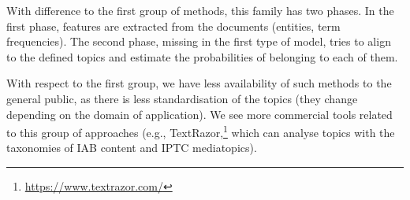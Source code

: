 With difference to the first group of methods, this family has two phases.
In the first phase, features are extracted from the documents (entities, term frequencies).
The second phase, missing in the first type of model, tries to align to the defined topics and estimate the probabilities of belonging to each of them.

With respect to the first group, we have less availability of such methods to the general public, as there is less standardisation of the topics (they change depending on the domain of application).
We see more commercial tools related to this group of approaches (e.g., TextRazor,\footnote{\url{https://www.textrazor.com/}} which can analyse topics with the taxonomies of IAB content and IPTC mediatopics).







